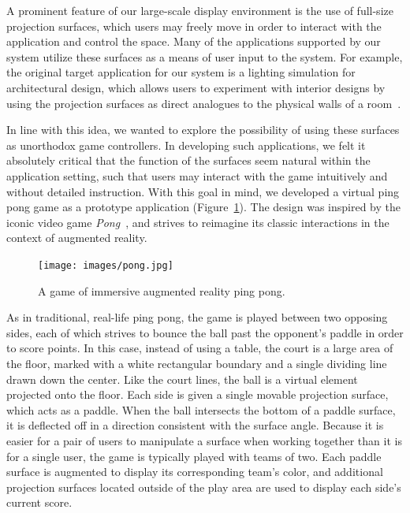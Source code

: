 \documentclass{thesis}
\begin{document}
A prominent feature of our large-scale display environment is the use of full-size projection surfaces, which users may freely move in order to interact with the application and control the space. Many of the applications supported by our system utilize these surfaces as a means of user input to the system. For example, the original target application for our system is a lighting simulation for architectural design, which allows users to experiment with interior designs by using the projection surfaces as direct analogues to the physical walls of a room~\cite{Sheng2009}.

In line with this idea, we wanted to explore the possibility of using these surfaces as unorthodox game controllers. In developing such applications, we felt it absolutely critical that the function of the surfaces seem natural within the application setting, such that users may interact with the game intuitively and without detailed instruction. With this goal in mind, we developed a virtual ping pong game as a prototype application (Figure~\ref{FIGURE:pong}). The design was inspired by the iconic video game \emph{Pong}~\cite{Pong}, and strives to reimagine its classic interactions in the context of augmented reality.

\begin{figure}[t]
\texttt{[image: images/pong.jpg]}
\caption[Spatially Augmented Ping Pong Game]{ A game of immersive augmented reality ping pong.}
\label{FIGURE:pong}
\vspace*{-0.15in}
\end{figure}

As in traditional, real-life ping pong, the game is played between two opposing sides, each of which strives to bounce the ball past the opponent's paddle in order to score points. In this case, instead of using a table, the court is a large area of the floor, marked with a white rectangular boundary and a single dividing line drawn down the center. Like the court lines, the ball is a virtual element projected onto the floor. Each side is given a single movable projection surface, which acts as a paddle. When the ball intersects the bottom of a paddle surface, it is deflected off in a direction consistent with the surface angle. Because it is easier for a pair of users to manipulate a surface when working together than it is for a single user, the game is typically played with teams of two. Each paddle surface is augmented to display its corresponding team's color, and additional projection surfaces located outside of the play area are used to display each side's current score.
\end{document}
